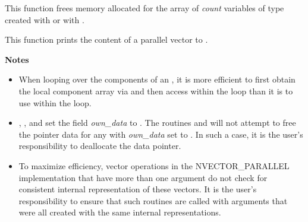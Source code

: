 \documentclass[letterpaper,10pt,english]{sphinxmanual}
\begin{document}

\begin{fulllineitems}
\label{nvectors/NVector_Parallel:N_VDestroyVectorArray_Parallel}
This function frees memory allocated for the array of \emph{count}
variables of type  created with
{\hyperref[nvectors/NVector_Parallel:N_VCloneVectorArray_Parallel]{}} or with
{\hyperref[nvectors/NVector_Parallel:N_VCloneEmptyVectorArray_Parallel]{}}.

\end{fulllineitems}


\begin{fulllineitems}
\label{nvectors/NVector_Parallel:N_VPrint_Parallel}
This function prints the content of a parallel vector to .

\end{fulllineitems}


\textbf{Notes}
\begin{itemize}
\item {} 
When looping over the components of an , it is
more efficient to first obtain the local component array via  and then access  within the loop than it
is to use  within the loop.

\item {} 
{\hyperref[nvectors/NVector_Parallel:N_VNewEmpty_Parallel]{}}, {\hyperref[nvectors/NVector_Parallel:N_VMake_Parallel]{}}, and
{\hyperref[nvectors/NVector_Parallel:N_VCloneEmptyVectorArray_Parallel]{}} set the field \emph{own\_data} to
. The routines  and
{\hyperref[nvectors/NVector_Parallel:N_VDestroyVectorArray_Parallel]{}} will not attempt to free the
pointer data for any  with \emph{own\_data} set to
. In such a case, it is the user's responsibility to
deallocate the data pointer.

\item {} 
To maximize efficiency, vector operations in the NVECTOR\_PARALLEL
implementation that have more than one  argument do not
check for consistent internal representation of these vectors. It is
the user's responsibility to ensure that such routines are called
with  arguments that were all created with the same
internal representations.

\end{itemize}
\end{document}
